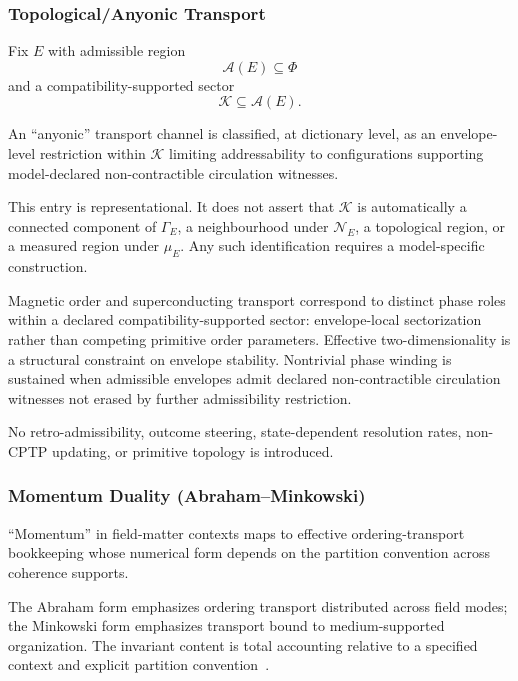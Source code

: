 \documentclass[aps,prx,onecolumn,11pt]{revtex4-2}
\theoremstyle{plain}
\theoremstyle{definition}
\theoremstyle{remark}
\begin{document}
\subsubsection{Topological/Anyonic Transport}
\label{appB:map_topological_anyon_transport}

Fix \(E\) with admissible region
\[
\mathcal A(E)\subseteq\Phi
\]
and a compatibility-supported sector
\[
\mathcal K\subseteq\mathcal A(E).
\]

An ``anyonic'' transport channel is classified, at dictionary level, as
an envelope-level restriction within \(\mathcal K\) limiting
addressability to configurations supporting model-declared
non-contractible circulation witnesses.

This entry is representational. It does not assert that
\(\mathcal K\) is automatically a connected component of \(\Gamma_E\),
a neighbourhood under \(\mathcal N_E\), a topological region, or a
measured region under \(\mu_E\). Any such identification requires a
model-specific construction.

Magnetic order and superconducting transport correspond to distinct
phase roles within a declared compatibility-supported sector:
envelope-local sectorization rather than competing primitive order
parameters. Effective two-dimensionality is a structural constraint on
envelope stability. Nontrivial phase winding is sustained when
admissible envelopes admit declared non-contractible circulation
witnesses not erased by further admissibility restriction.

No retro-admissibility, outcome steering, state-dependent resolution
rates, non-CPTP updating, or primitive topology is introduced.

\subsubsection{Momentum Duality (Abraham--Minkowski)}
\label{appB:momentum_duality_mapping}

``Momentum'' in field-matter contexts maps to effective
ordering-transport bookkeeping whose numerical form depends on the
partition convention across coherence supports.

The Abraham form emphasizes ordering transport distributed across field
modes; the Minkowski form emphasizes transport bound to
medium-supported organization. The invariant content is total
accounting relative to a specified context and explicit partition
convention~\cite{Abraham1909,Minkowski1908,Barnett2010}.
\end{document}
